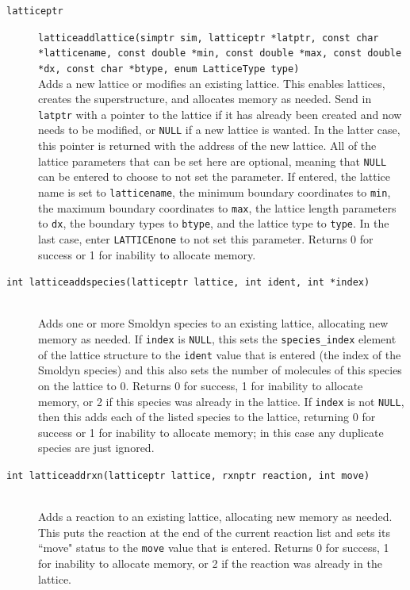 \documentclass {scrbook}
\newcommand {\ttt} {\texttt}
\begin{document}
\begin{description}
\item[\ttt{latticeptr}]
\ttt{latticeaddlattice(simptr sim, latticeptr *latptr, const char *latticename, const double *min, const double *max, const double *dx, const char *btype, enum LatticeType type)}
\hfill \\
Adds a new lattice or modifies an existing lattice. This enables lattices, creates the superstructure, and allocates memory as needed. Send in \ttt{latptr} with a pointer to the lattice if it has already been created and now needs to be modified, or \ttt{NULL} if a new lattice is wanted. In the latter case, this pointer is returned with the address of the new lattice. All of the lattice parameters that can be set here are optional, meaning that \ttt{NULL} can be entered to choose to not set the parameter. If entered, the lattice name is set to \ttt{latticename}, the minimum boundary coordinates to \ttt{min}, the maximum boundary coordinates to \ttt{max}, the lattice length parameters to \ttt{dx}, the boundary types to \ttt{btype}, and the lattice type to \ttt{type}. In the last case, enter \ttt{LATTICEnone} to not set this parameter. Returns 0 for success or 1 for inability to allocate memory.

\item[\ttt{int latticeaddspecies(latticeptr lattice, int ident, int *index)}]
\hfill \\
Adds one or more Smoldyn species to an existing lattice, allocating new memory as needed. If \ttt{index} is \ttt{NULL}, this sets the \ttt{species\_index} element of the lattice structure to the \ttt{ident} value that is entered (the index of the Smoldyn species) and this also sets the number of molecules of this species on the lattice to 0. Returns 0 for success, 1 for inability to allocate memory, or 2 if this species was already in the lattice. If \ttt{index} is not \ttt{NULL}, then this adds each of the listed species to the lattice, returning 0 for success or 1 for inability to allocate memory; in this case any duplicate species are just ignored.

\item[\ttt{int latticeaddrxn(latticeptr lattice, rxnptr reaction, int move)}]
\hfill \\
Adds a reaction to an existing lattice, allocating new memory as needed. This puts the reaction at the end of the current reaction list and sets its ``move" status to the \ttt{move} value that is entered. Returns 0 for success, 1 for inability to allocate memory, or 2 if the reaction was already in the lattice.


\end{description}
\end{document}
